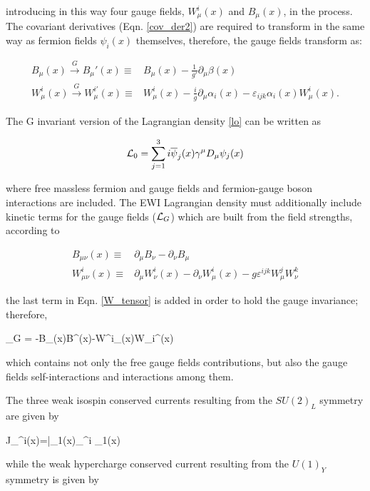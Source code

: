 \noindent introducing in this way four gauge fields, $W_\mu^i(x)$ and $B_\mu(x)$, in the process. The covariant derivatives (Eqn. \ref{cov_der2}) are required to transform in the same way as fermion fields $\psi_i(x)$ themselves, therefore, the gauge fields transform as:

\begin{align}\label{f_transf}
B_\mu(x) \xrightarrow[]{G} B_\mu'(x)\equiv & B_\mu(x)
- \frac{1}{g'}\partial_\mu\beta(x) \nonumber\\
W^i_\mu(x) \xrightarrow[]{G} W_\mu^{i\prime}(x)\equiv & W^i_\mu(x) - \frac{i}{g}\partial_\mu \alpha_i(x) - \varepsilon_{ijk}\alpha_i(x)W^i_\mu(x).
\end{align}

The G invariant version of the Lagrangian density \ref{lo} can be written as

\begin{equation}\label{linv}
\mathcal{L}_0 = \sum_{j=1}^3 i\overline{\psi}_j(x)\gamma^\mu D_\mu \psi_j(x)
\end{equation}

\noindent where free massless fermion and gauge fields and fermion-gauge boson interactions are included. The EWI Lagrangian density must additionally include kinetic terms for the gauge fields ($\mathcal{L}_G$) which are built from the field strengths, according to

\begin{align}
B_{\mu\nu}(x)   \equiv & \partial_\mu B_\nu -  \partial_\nu B_\mu \label{B_tensor} \\ 
W^i_{\mu\nu}(x) \equiv & \partial_\mu W^i_\nu(x) - \partial_\nu W^i_\mu(x) - g\varepsilon^{ijk}W^j_\mu W^k_\nu \label{W_tensor}
\end{align}

\noindent the last term in Eqn. \ref{W_tensor} is added in order to hold the gauge invariance; therefore,

\beqn\label{lg}
\Lagr_G = -B_{\mu\nu}(x)B^{\mu\nu}(x)-W^i_{\mu\nu}(x)W_i^{\mu\nu}(x)
\eeqn

\noindent which contains not only the free gauge fields contributions, but also the gauge fields self-interactions and interactions among them.

The three weak isospin conserved currents resulting from the $SU(2)_L$ symmetry are given by

\beqn
J_\mu^i(x)=\bar{\psi_1}(x)\gamma_\mu \sigma^i \psi_1(x) 
\eeqn

\noindent while the weak hypercharge conserved current resulting from the $U(1)_Y$ symmetry is given by 

